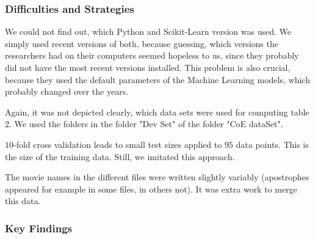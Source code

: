 \subsubsection*{Difficulties and Strategies}
We could not find out, which Python and Scikit-Learn version was used. We simply used recent versions of both, because guessing, which versions the researchers had on their computers seemed hopeless to us, since they probably did not have the most recent versions installed. This problem is also crucial, because they used the default parameters of the Machine Learning models, which probably changed over the years. 

Again, it was not depicted clearly, which data sets were used for computing table $2$. We used the folders in the folder "Dev Set" of the folder "CoE dataSet". 

$10$-fold cross validation leads to small test sizes applied to $95$ data points. This is the size of the training data. Still, we imitated this approach. 

The movie names in the different files were written slightly variably (apostrophes appeared for example in some files, in others not). It was extra work to merge this data. 



\subsubsection*{Key Findings}